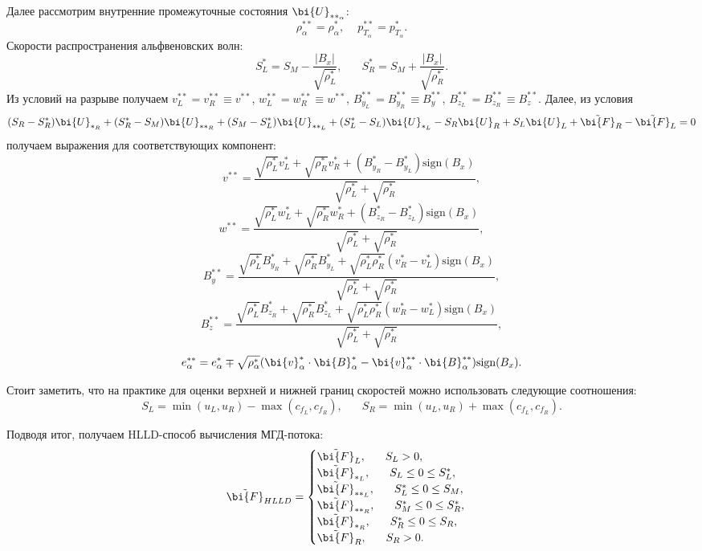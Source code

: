 \documentclass[12pt, a4paper]{article}
\begin{document}
 	Далее рассмотрим внутренние промежуточные состояния $\bi{U}_{**_\alpha}$:
 	\[
 	\rho_\alpha^{**} = \rho_\alpha^{*}, \phantom{xx} p_{T_\alpha}^{**} = p_{T_\alpha}^{*}.
 	\]
 	Скорости распространения альфвеновских волн:
 	\[
 	S_L^* = S_M - \dfrac{|B_x|}{\sqrt{\rho_L^*}}, \phantom{xxx} S_R^* = S_M + \dfrac{|B_x|}{\sqrt{\rho_R^*}}.
 	\]
 	Из условий на разрыве получаем $v_L^{**} = v_R^{**} \equiv v^{**}$, $w_L^{**} = w_R^{**} \equiv w^{**}$, $B_{y_L}^{**} = B_{y_R}^{**} \equiv B_{y}^{**}$, $B_{z_L}^{**} = B_{z_R}^{**} \equiv B_{z}^{**}$. Далее, из условия
 	\[
 	(S_R-S_R^*)\bi{U}_{*_R} + (S_R^*-S_M)\bi{U}_{**_R} + (S_M-S_L^*)\bi{U}_{**_L} + (S_L^*-S_L)\bi{U}_{*_L} -S_R\bi{U}_R + S_L\bi{U}_L + \tilde{\bi{F}}_R - \tilde{\bi{F}}_L = 0
 	\]
 	получаем выражения для соответствующих компонент:
 	\[
 	v^{**} = \dfrac{ \sqrt{\rho_L^*}v_L^* + \sqrt{\rho_R^*}v_R^* + ( B_{y_R}^{*} - B_{y_L}^{*} )\text{sign}(B_x) }{  \sqrt{\rho_L^*} + \sqrt{\rho_R^*} },
 	\]
 	\[
 	w^{**} = \dfrac{ \sqrt{\rho_L^*}w_L^* + \sqrt{\rho_R^*}w_R^* + ( B_{z_R}^{*} - B_{z_L}^{*} )\text{sign}(B_x) }{  \sqrt{\rho_L^*} + \sqrt{\rho_R^*} },
 	\]
 	\[
 	B_y^{**} = \dfrac{ \sqrt{\rho_L^*}B_{y_R}^{*} + \sqrt{\rho_R^*}B_{y_L}^{*} + \sqrt{\rho_L^*\rho_R^*}(v_R^*-v_L^*)\text{sign}(B_x) }{  \sqrt{\rho_L^*} + \sqrt{\rho_R^*} },
 	\]
 	\[
 	B_z^{**} = \dfrac{ \sqrt{\rho_L^*}B_{z_R}^{*} + \sqrt{\rho_R^*}B_{z_L}^{*} + \sqrt{\rho_L^*\rho_R^*}(w_R^*-w_L^*)\text{sign}(B_x) }{  \sqrt{\rho_L^*} + \sqrt{\rho_R^*} },
 	\]
 	\[
 	e_\alpha^{**} = e_\alpha^* \mp \sqrt{\rho_\alpha^*}(\bi{v}^*_\alpha \cdot \bi{B}^*_\alpha - \bi{v}_\alpha^{**} \cdot \bi{B}_\alpha^{**} )\text{sign}(B_x).
 	\]
 	
 	Стоит заметить, что на практике для оценки верхней и нижней границ скоростей можно использовать следующие соотношения:
 	\[
 	S_L = \min(u_L,u_R)-\max(c_{f_L},c_{f_R}), \phantom{xxx} S_R = \min(u_L,u_R) + \max(c_{f_L},c_{f_R}).
 	\]
 	
 	Подводя итог, получаем HLLD-способ вычисления МГД-потока:
 	\[
 	\tilde{\bi{F}}_{HLLD} = 
 	\begin{cases}
 		\tilde{\bi{F}}_{L}, \phantom{xxx} S_L > 0, \\
 		\tilde{\bi{F}}_{*_L}, \phantom{xxx} S_L \le 0 \le S_L^*, \\
 		\tilde{\bi{F}}_{**_L}, \phantom{xxx} S_L^* \le 0 \le S_M, \\
 		\tilde{\bi{F}}_{**_R}, \phantom{xxx} S_M^* \le 0 \le S_R^*, \\
 		\tilde{\bi{F}}_{*_R}, \phantom{xxx} S_R^* \le 0 \le S_R, \\
 		\tilde{\bi{F}}_{R}, \phantom{xxx} S_R > 0.
 	\end{cases}
 	\]
\end{document}
